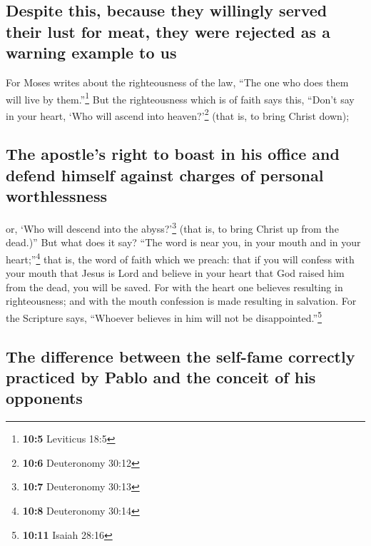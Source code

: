 \hypertarget{despite-this-because-they-willingly-served-their-lust-for-meat-they-were-rejected-as-a-warning-example-to-us}{%
\subsection{Despite this, because they willingly served their lust for
meat, they were rejected as a warning example to
us}\label{despite-this-because-they-willingly-served-their-lust-for-meat-they-were-rejected-as-a-warning-example-to-us}}

 For Moses writes about the righteousness of the law,
``The one who does them will live by them.''\footnote{\textbf{10:5}
  Leviticus 18:5}  But the righteousness which is of faith
says this, ``Don't say in your heart, `Who will ascend into
heaven?'\footnote{\textbf{10:6} Deuteronomy 30:12} (that is, to bring
Christ down);

\hypertarget{the-apostles-right-to-boast-in-his-office-and-defend-himself-against-charges-of-personal-worthlessness}{%
\subsection{The apostle's right to boast in his office and defend
himself against charges of personal
worthlessness}\label{the-apostles-right-to-boast-in-his-office-and-defend-himself-against-charges-of-personal-worthlessness}}

 or, `Who will descend into the abyss?'\footnote{\textbf{10:7}
  Deuteronomy 30:13} (that is, to bring Christ up from the dead.)''
 But what does it say? ``The word is near you, in your
mouth and in your heart;''\footnote{\textbf{10:8} Deuteronomy 30:14}
that is, the word of faith which we preach:  that if you
will confess with your mouth that Jesus is Lord and believe in your
heart that God raised him from the dead, you will be saved.
 For with the heart one believes resulting in
righteousness; and with the mouth confession is made resulting in
salvation.  For the Scripture says, ``Whoever believes in
him will not be disappointed.''\footnote{\textbf{10:11} Isaiah 28:16}

\hypertarget{the-difference-between-the-self-fame-correctly-practiced-by-pablo-and-the-conceit-of-his-opponents}{%
\subsection{The difference between the self-fame correctly practiced by
Pablo and the conceit of his
opponents}\label{the-difference-between-the-self-fame-correctly-practiced-by-pablo-and-the-conceit-of-his-opponents}}

